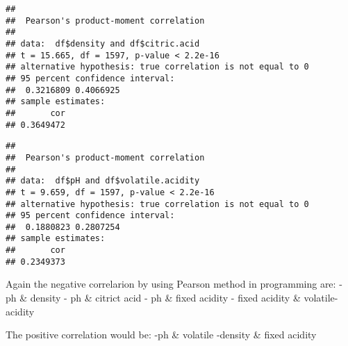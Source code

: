 \documentclass[]{article}
\begin{document}
\begin{verbatim}
## 
##  Pearson's product-moment correlation
## 
## data:  df$density and df$citric.acid
## t = 15.665, df = 1597, p-value < 2.2e-16
## alternative hypothesis: true correlation is not equal to 0
## 95 percent confidence interval:
##  0.3216809 0.4066925
## sample estimates:
##       cor 
## 0.3649472
\end{verbatim}

\begin{verbatim}
## 
##  Pearson's product-moment correlation
## 
## data:  df$pH and df$volatile.acidity
## t = 9.659, df = 1597, p-value < 2.2e-16
## alternative hypothesis: true correlation is not equal to 0
## 95 percent confidence interval:
##  0.1880823 0.2807254
## sample estimates:
##       cor 
## 0.2349373
\end{verbatim}

Again the negative correlarion by using Pearson method in programming
are: - ph \& density - ph \& citrict acid - ph \& fixed acidity - fixed
acidity \& volatile-acidity

The positive correlation would be: -ph \& volatile -density \& fixed
acidity
\end{document}

